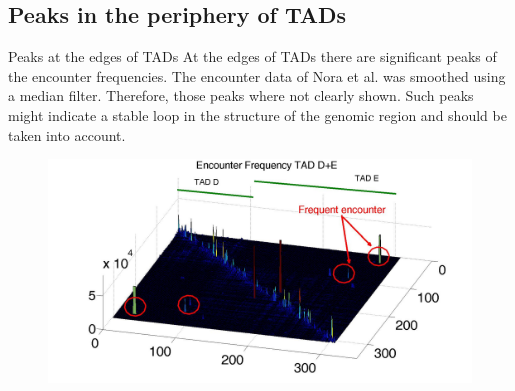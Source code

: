 \documentclass[8pt]{beamer}
\begin{document}
\subsection{Peaks in the periphery of TADs}\label{subsection_peaksInThePeripheryOfTADs}
\begin{frame}{Peaks at the edges of TADs}
At the edges of TADs there are significant peaks of the encounter frequencies.
The encounter data of Nora et al. was smoothed using a median filter. Therefore, those peaks where not clearly shown.
Such peaks might indicate a stable loop in the structure of the genomic region and should be taken into account.

\begin{figure}[H]
\includegraphics[scale=0.2]{peaksOfTADDAndEInSurfPlot}
\end{figure}
\end{frame}
\end{document}
